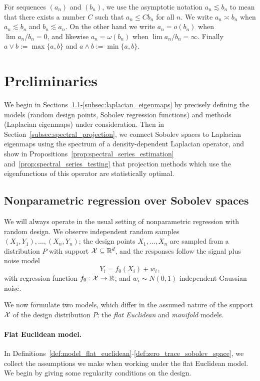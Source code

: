 For sequences $(a_n)$ and $(b_n)$, we use the asymptotic notation $a_n \lesssim b_n$ to mean that there exists a number $C$ such that $a_n \leq C b_n$ for all $n$. We write $a_n \asymp b_n$ when $a_n \lesssim b_n$ and $b_n \lesssim a_n$. On the other hand we write $a_n = o(b_n)$ when $\lim a_n/b_n = 0$, and likewise $a_n = \omega(b_n)$ when $\lim a_n/b_n = \infty$. Finally $a \vee b := \max\{a,b\}$ and $a \wedge b := \min\{a,b\}$.

\section{Preliminaries}
\label{sec:setup_main_results}

We begin in Sections~\ref{subsec:regression_laplacian_eigenmaps}-\ref{subsec:laplacian_eigenmaps} by precisely defining the models (random design points, Sobolev regression functions) and methods (Laplacian eigenmaps) under consideration. Then in Section~\ref{subsec:spectral_projection}, we connect Sobolev spaces to Laplacian eigenmaps using the spectrum of a density-dependent Laplacian operator, and show in Propositions~\ref{prop:spectral_series_estimation} and~\ref{prop:spectral_series_testing} that projection methods which use the eigenfunctions of this operator are statistically optimal.

\subsection{Nonparametric regression over Sobolev spaces}
\label{subsec:regression_laplacian_eigenmaps}

We will always operate in the usual setting of nonparametric regression with random design. We observe independent random samples $(X_1,Y_1),\ldots,(X_n,Y_n)$; the design points $X_1,\ldots,X_n$ are sampled from a distribution $P$ with support $\mathcal{X} \subseteq \mathbb{R}^d$, and the responses follow the signal plus noise model
\begin{equation}
\label{eqn:model}
Y_i = f_0(X_i) + w_i,
\end{equation}
with regression function $f_0: \mathcal{X} \to \mathbb{R}$, and $w_i \sim N(0,1)$ independent Gaussian noise.

We now formulate two models, which differ in the assumed nature of the support $\mathcal{X}$ of the design distribution $P$: the \emph{flat Euclidean} and \emph{manifold} models.

\paragraph{Flat Euclidean model.}
In Definitions~\ref{def:model_flat_euclidean}-\ref{def:zero_trace_sobolev_space}, we collect the assumptions we make when working under the flat Euclidean model. We begin by giving some regularity conditions on the design.

